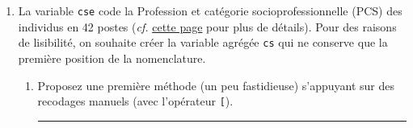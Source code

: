 \documentclass[12pt,twosided, notitlepage]{book}
\newenvironment{Shaded}{}{}
\newcommand{\KeywordTok}[1]{\textcolor[rgb]{0.00,0.00,1.00}{{#1}}}
\newcommand{\CommentTok}[1]{\textcolor[rgb]{0.00,0.50,0.00}{{#1}}}
\newcommand{\NormalTok}[1]{{#1}}
\newif \ifsol
\renewenvironment{Shaded}{\begin{snugshade}}{\end{snugshade}}
\begin{document}
\begin{enumerate}
\def\labelenumi{\alph{enumi}.}
\item
  La variable \texttt{cse} code la Profession et catégorie
  socioprofessionnelle (PCS) des individus en 42 postes (\emph{cf.}
  \href{https://www.insee.fr/fr/information/2400059}{cette page} pour
  plus de détails). Pour des raisons de lisibilité, on souhaite créer la
  variable agrégée \texttt{cs} qui ne conserve que la première position
  de la nomenclature.

  \begin{enumerate}
  \def\labelenumii{\roman{enumii}.}
  \item
    Proposez une première méthode (un peu fastidieuse) s'appuyant sur
    des recodages manuels (avec l'opérateur
    \texttt{{[}})\index{\texttt{[}}.

    \ifsol 

    \begin{center} \rule{0.5\linewidth}{\linethickness}\end{center}

\begin{Shaded}
\end{Shaded}
\end{enumerate}
\end{enumerate}
\end{document}
